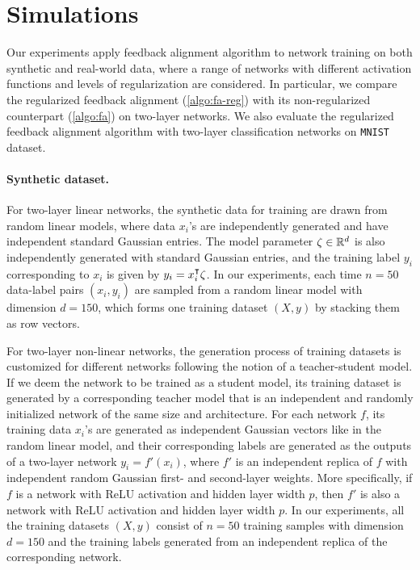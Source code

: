 \section{Simulations}

Our experiments apply feedback alignment algorithm to network training on both synthetic and real-world data, where a range of networks with different activation functions and levels of regularization are considered. In particular, we compare the regularized feedback alignment (\cref{algo:fa-reg}) with its non-regularized counterpart (\cref{algo:fa}) on two-layer networks. We also evaluate the regularized feedback alignment algorithm with two-layer classification networks on \texttt{MNIST} dataset.

\paragraph{Synthetic dataset.}

For two-layer linear networks, the synthetic data for training are drawn from random linear models, where data $x_i$'s are independently generated and have independent standard Gaussian entries. The model parameter $\zeta\in{\mathbb{R}^{d}}$ is also independently generated with standard Gaussian entries, and the training label $y_i$ corresponding to $x_i$ is given by $y_i = x_i\transpose \zeta$. In our experiments, each time $n = 50$ data-label pairs $(x_i,y_i)$ are sampled from a random linear model with dimension $d = 150$, which forms one training dataset $(X,y)$ by stacking them as row vectors.

For two-layer non-linear networks, the generation process of training datasets is customized for different networks following the notion of a teacher-student model. If we deem the network to be trained as a student model, its training dataset is generated by a corresponding teacher model that is an independent and randomly initialized network of the same size and architecture. For each network $f$, its training data $x_i$'s are generated as independent Gaussian vectors like in the random linear model, and their corresponding labels are generated as the outputs of a two-layer network $y_i = f'(x_i)$, where $f'$ is an independent replica of $f$ with independent random Gaussian first- and second-layer weights. More specifically, if $f$ is a network with ReLU activation and hidden layer width $p$, then $f'$ is also a network with ReLU activation and hidden layer width $p$. In our experiments, all the training datasets $(X,y)$ consist of $n = 50$ training samples with dimension $d = 150$ and the training labels generated from an independent replica of the corresponding network.

